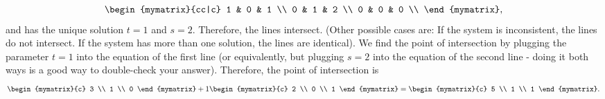 \begin{solution}
  \begin{equation*}
    \begin{mymatrix}{cc|c}
      1 & 0 & 1 \\
      0 & 1 & 2 \\
      0 & 0 & 0 \\
    \end{mymatrix},
  \end{equation*}
  and has the unique solution $t=1$ and $s=2$. Therefore, the lines
  intersect. (Other possible cases are: If the system is inconsistent,
  the lines do not intersect. If the system has more than one
  solution, the lines are identical). We find the point of
  intersection by plugging the parameter $t=1$ into the equation of
  the first line (or equivalently, but plugging $s=2$ into the
  equation of the second line - doing it both ways is a good way to
  double-check your answer). Therefore, the point of intersection is
  \begin{equation*}
    \begin{mymatrix}{c} 3 \\ 1 \\ 0 \end{mymatrix}
    + 1 \begin{mymatrix}{c} 2 \\ 0 \\ 1 \end{mymatrix}
    = \begin{mymatrix}{c} 5 \\ 1 \\ 1 \end{mymatrix}.
  \end{equation*}
\end{solution}


